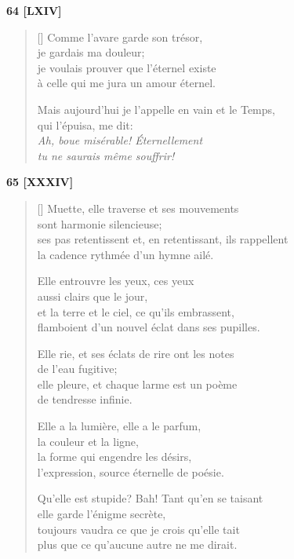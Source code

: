 \documentclass[a4paper,12pt]{book}
\begin{document}
\bigskip

\begin{center}
  \textbf{64 [LXIV]}
\end{center}

\settowidth{\versewidth}{Mais aujourd'hui en vain je l'appelle et le Temps,}

\begin{verse}[\versewidth]
  Comme l'avare garde son trésor, \\
  je gardais ma douleur; \\
  je voulais prouver que l'éternel existe \\
  à celle qui me jura un amour éternel.

  Mais aujourd'hui je l'appelle en vain et le Temps, \\
  qui l'épuisa, me dit: \\
  \emph{Ah, boue misérable! Éternellement \\
    tu ne saurais même souffrir!}
\end{verse}

\bigskip

\begin{center}
  \textbf{65 [XXXIV]}
\end{center}

\settowidth{\versewidth}{flamboient d'un nouvel éclat dans ses pupilles.}

\begin{verse}[\versewidth]
  Muette, elle traverse et ses mouvements \\
  sont harmonie silencieuse; \\
  ses pas retentissent et, en retentissant, ils rappellent \\
  la cadence rythmée d'un hymne ailé.

  Elle entrouvre les yeux, ces yeux \\
  aussi clairs que le jour, \\
  et la terre et le ciel, ce qu'ils embrassent, \\
  flamboient d'un nouvel éclat dans ses pupilles.

  Elle rie, et ses éclats de rire ont les notes \\
  de l'eau fugitive; \\
  elle pleure, et chaque larme est un poème \\
  de tendresse infinie.

  Elle a la lumière, elle a le parfum, \\
  la couleur et la ligne, \\
  la forme qui engendre les désirs, \\
  l'expression, source éternelle de poésie.

  Qu'elle est stupide? Bah! Tant qu'en se taisant \\
  elle garde l'énigme secrète, \\
  toujours vaudra ce que je crois qu'elle tait \\
  plus que ce qu'aucune autre ne me dirait.
\end{verse}
\end{document}
